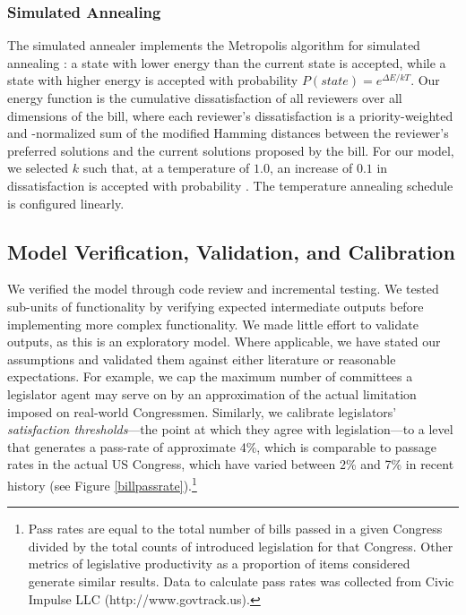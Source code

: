 \documentclass[pdftex,12pt]{llncs}
\begin{document}
\subsubsection{Simulated Annealing}
The simulated annealer implements the Metropolis algorithm for simulated annealing \parencite{mrrt53, kgv}: a state with lower energy than the current state is accepted, while a state with higher energy is accepted with probability $P(state) = e^{\Delta E/kT}$.
Our energy function is the cumulative dissatisfaction of all reviewers over all dimensions of the bill, where each reviewer's dissatisfaction is a priority-weighted and -normalized sum of the modified Hamming distances between the reviewer's preferred solutions and the current solutions proposed by the bill. For our model, we selected $k$ such that, at a temperature of $1.0$, an increase of $0.1$ in dissatisfaction is accepted with probability . The temperature annealing schedule is configured linearly.

\subsection{Model Verification, Validation, and Calibration}
We verified the model through code review and incremental testing.
We tested sub-units of functionality by verifying expected intermediate outputs before implementing more complex functionality.
We made little effort to validate outputs, as this is an exploratory model.
Where applicable, we have stated our assumptions and validated them against either literature or reasonable expectations.
For example, we cap the maximum number of committees a legislator agent may serve on by an approximation of the actual limitation imposed on real-world Congressmen.
Similarly, we calibrate legislators' \textit{satisfaction thresholds}---the point at which they agree with legislation---to a level that generates a pass-rate of approximate 4\%, which is comparable to passage rates in the actual US Congress, which have varied between 2\% and 7\% in recent history (see Figure \ref{billpassrate}).\footnote{Pass rates are equal to the total number of bills passed in a given Congress divided by the total counts of introduced legislation for that Congress. Other metrics of legislative productivity as a proportion of items considered generate similar results. Data to calculate pass rates was collected from Civic Impulse LLC (http://www.govtrack.us).\label{passfn}}
\end{document}
